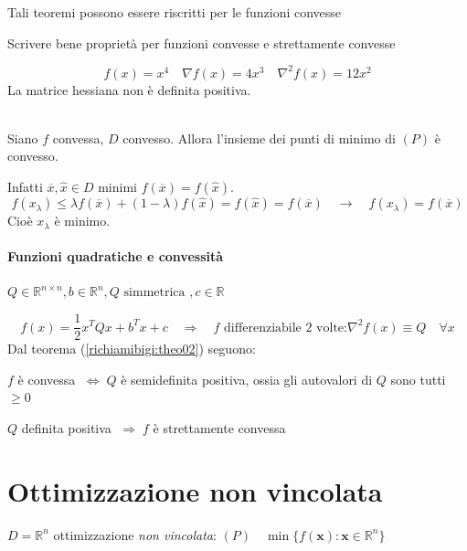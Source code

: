 \begin{notes}
 Tali teoremi possono essere riscritti per le funzioni convesse
\end{notes}

\begin{todo}
 Scrivere bene proprietà per funzioni convesse e strettamente convesse
\end{todo}
$$f(x) = x^4 \quad \nabla f(x) = 4x^{3} \quad \nabla^{2} f(x) = 12 x^{2} $$ 
La matrice hessiana non è definita positiva. \\ \\

\begin{proposition}
 Siano $f$ convessa, $D$ convesso. Allora l'insieme dei punti di minimo
 di $(P)$ è convesso.
\end{proposition}

Infatti  $\overline{x}, \hat{x} \in D$ minimi $f(\overline{x}) = f(\hat{x})$.
  $$ f(x_{\lambda}) \leq  \lambda f(\overline{x}) + 
  (1-\lambda) f(\hat{x})  = f(\hat{x}) = f(\overline{x})
  \quad \rightarrow \quad  f(x_{\lambda}) = f(\overline{x})$$
  Cioè $x_{\lambda}$ è minimo.

\paragraph{Funzioni quadratiche e convessit\`a}
 $Q \in \mathbb{R}^{n \times n} , b \in \mathbb{R}^{n},
 Q \text{ simmetrica }, c \in \mathbb{R}$

$$ f(x) = \dfrac{1}{2} x^{T}Qx + b^{T}x + c
\quad \Longrightarrow \quad f \text{ differenziabile 2 volte:}
\nabla^{2}f(x) \equiv Q \quad \forall x
$$
Dal teorema (\ref{richiamibigi:theo02}) seguono:
\begin{property}
$f$ \`e convessa $\; \Longleftrightarrow \; Q$ \`e semidefinita positiva,
ossia gli autovalori di $Q$ sono tutti $\geq 0$
\end{property}

\begin{property}\label{prop:quadratica-defpos-convessa}
$Q$ definita positiva $\; \Longrightarrow \; f$ \`e strettamente convessa
\end{property}



\section{Ottimizzazione non vincolata}
$D = \mathbb{R}^{n}$ ottimizzazione \emph{non vincolata}: $(P) \quad \min\{f(\mathbf{x}): \mathbf{x} \in \mathbb{R}^{n}\}$
